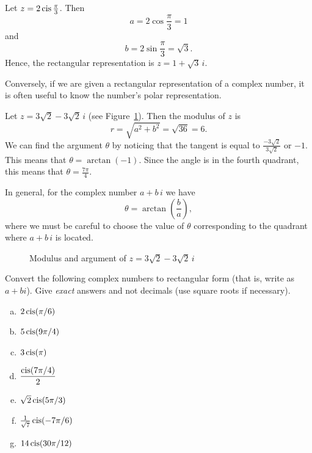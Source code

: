 \begin{example}{1} Let $z=2\operatorname{cis} \frac{\pi}{3}$. Then
\[
a=2\cos \frac{\pi}{3}=1\]
 and \[
b=2\sin \frac{\pi}{3}=\sqrt{3}.\]
 Hence, the rectangular representation is $z=1+\sqrt{3}\, i$.
\end{example}
Conversely, if we are given a rectangular representation of a complex
number, it is often useful to know the number's polar representation.

\begin{example}{2} Let $z=3\sqrt{2}-3\sqrt{2}\, i$ (see Figure~\ref{fig:complex:polar_to_cart}). Then the modulus of $z$ is 
\[
r=\sqrt{a^{2}+b^{2}}=\sqrt{36}=6.\]
 We can find the argument $\theta$ by noticing that the tangent is equal to $\frac{-3\sqrt{2}}{3\sqrt{2}}$ or $-1$. This means that
 $\theta = \arctan(-1)$.
 Since the angle is in the fourth quadrant, this means that $\theta = \frac{7\pi}{4}$. 
 
 In general, for the complex number $a + b\,i$ we have
 \[\theta=\arctan\left(\frac{b}{a}\right),\]
where we must be careful to choose the value of $\theta$ corresponding to the quadrant where $a + b\,i$ is located. 
 \end{example} 
\begin{figure}[htb]
	  \caption{\label{fig:complex:polar_to_cart} Modulus and argument of  $z=3\sqrt{2}-3\sqrt{2}\, i$}
\end{figure}

\begin{exercise}{21}
Convert the following complex numbers to rectangular form (that is, write as $a + bi$). Give \emph{exact} answers and not decimals (use square roots if necessary).
\begin{multicols}{2}
\begin{enumerate}[(a)]

\item
$2 \operatorname{cis}(\pi / 6 )$
\item
$5 \operatorname{cis}(9\pi/4)$
\item
$3 \operatorname{cis}(\pi)$
 \item
$\dfrac{\operatorname{cis}(7\pi/4)}{2}$
\item
$\sqrt{2} \operatorname{cis}(5\pi / 3 )$
\item
$\frac{1}{\sqrt{7}} \operatorname{cis}(-7\pi / 6 )$
\item
$14 \operatorname{cis}(30 \pi / 12 )$

\end{enumerate}
\end{multicols}
\end{exercise}

